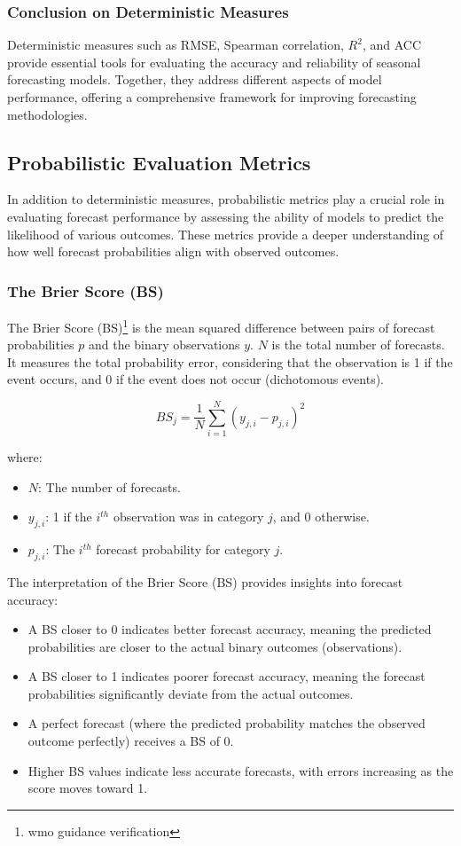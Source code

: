 \subsubsection{Conclusion on Deterministic Measures}

Deterministic measures such as RMSE, Spearman correlation, \( R^2 \), and ACC provide essential tools for evaluating the accuracy and reliability of seasonal forecasting models. Together, they address different aspects of model performance, offering a comprehensive framework for improving forecasting methodologies.



\subsection{Probabilistic Evaluation Metrics}
In addition to deterministic measures, probabilistic metrics play a crucial role in evaluating forecast performance by assessing the ability of models to predict the likelihood of various outcomes. These metrics provide a deeper understanding of how well forecast probabilities align with observed outcomes.

\subsubsection{The Brier Score (BS)}
The Brier Score (BS)\footnote{wmo guidance verification} is the mean squared difference between pairs of forecast probabilities \( p \) and the binary observations \( y \). \( N \) is the total number of forecasts. It measures the total probability error, considering that the observation is 1 if the event occurs, and 0 if the event does not occur (dichotomous events).

\[
BS_j = \frac{1}{N} \sum_{i=1}^{N} (y_{j,i} - p_{j,i})^2
\]

where:  
\begin{itemize}
    \item \( N \): The number of forecasts.  
    \item \( y_{j,i} \): 1 if the \( i^{th} \) observation was in category \( j \), and 0 otherwise.  
    \item \( p_{j,i} \): The \( i^{th} \) forecast probability for category \( j \).  
\end{itemize}

The interpretation of the Brier Score (BS) provides insights into forecast accuracy:  
\begin{itemize}
    \item A BS closer to 0 indicates better forecast accuracy, meaning the predicted probabilities are closer to the actual binary outcomes (observations).  
    \item A BS closer to 1 indicates poorer forecast accuracy, meaning the forecast probabilities significantly deviate from the actual outcomes.  
    \item A perfect forecast (where the predicted probability matches the observed outcome perfectly) receives a BS of 0.  
    \item Higher BS values indicate less accurate forecasts, with errors increasing as the score moves toward 1.  
\end{itemize}


